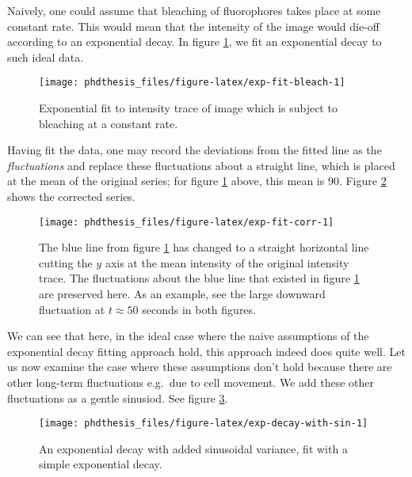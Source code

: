 \documentclass[12pt,]{book}
\theoremstyle{definition}
\theoremstyle{definition}
\theoremstyle{definition}
\theoremstyle{remark}
\begin{document}
Naively, one could assume that bleaching of fluorophores takes place at
some constant rate. This would mean that the intensity of the image
would die-off according to an exponential decay. In figure
\ref{fig:exp-fit-bleach}, we fit an exponential decay to such ideal
data.




\begin{figure}

\texttt{[image: phdthesis\_files/figure-latex/exp-fit-bleach-1]} \hfill{}

\caption{Exponential fit to intensity trace of image
which is subject to bleaching at a constant rate.}\label{fig:exp-fit-bleach}
\end{figure}

Having fit the data, one may record the deviations from the fitted line
as the \emph{fluctuations} and replace these fluctuations about a
straight line, which is placed at the mean of the original series; for
figure \ref{fig:exp-fit-bleach} above, this mean is 90. Figure
\ref{fig:exp-fit-corr} shows the corrected series.








\begin{figure}

\texttt{[image: phdthesis\_files/figure-latex/exp-fit-corr-1]} \hfill{}

\caption{The blue line from figure
\ref{fig:exp-fit-bleach} has changed to a straight horizontal line
cutting the \(y\) axis at the mean intensity of the original intensity
trace. The fluctuations about the blue line that existed in figure
\ref{fig:exp-fit-bleach} are preserved here. As an example, see the
large downward fluctuation at \(t \approx 50\) seconds in both figures.}\label{fig:exp-fit-corr}
\end{figure}

We can see that here, in the ideal case where the naive assumptions of
the exponential decay fitting approach hold, this approach indeed does
quite well. Let us now examine the case where these assumptions don't
hold because there are other long-term fluctuations e.g.~due to cell
movement. We add these other fluctuations as a gentle sinusiod. See
figure \ref{fig:exp-decay-with-sin}.




\begin{figure}

\texttt{[image: phdthesis\_files/figure-latex/exp-decay-with-sin-1]} \hfill{}

\caption{An exponential decay with added
sinusoidal variance, fit with a simple exponential decay.}\label{fig:exp-decay-with-sin}
\end{figure}
\end{document}
